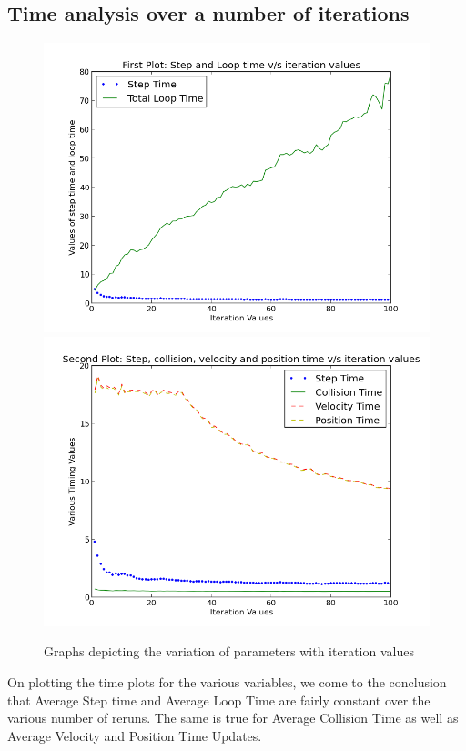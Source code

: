 \documentclass[a4paper,11pt]{article}
\begin{document}
	\subsection{Time analysis over a number of iterations}
	\begin{figure}
	\includegraphics[scale=0.45]{1-1.png}
	\includegraphics[scale=0.45]{1-2.png}
	\caption{Graphs depicting the variation of parameters with iteration values}
	\end{figure}
	On plotting the time plots for the various variables, we come to the conclusion that Average Step time and Average Loop Time are fairly constant over the various number of reruns.
	The same is true for Average Collision Time as well as Average Velocity and Position Time Updates.
\end{document}
